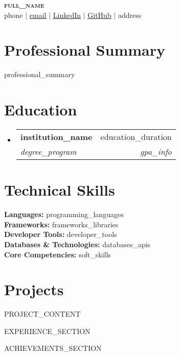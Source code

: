\documentclass[letterpaper,11pt]{article}
\makeatletter
\newcommand{\resumeSubheading}[4]{
  \vspace{-1pt}\item
    \begin{tabular*}{0.97\textwidth}[t]{l@{\extracolsep{\fill}}r}
      \textbf{#1} & #2 \\
      \textit{\small#3} & \textit{\small #4} \\
    \end{tabular*}\vspace{-5pt}
}
\newcommand{\resumeSubHeadingListStart}{\begin{itemize}[leftmargin=0.15in, label={}]}
\newcommand{\resumeSubHeadingListEnd}{\end{itemize}}
\makeatother
\begin{document}
\begin{center}
    \textbf{\Huge \scshape {{full_name}}} \\ \vspace{1pt}
    \small {{phone}} $|$ \href{mailto:{{email}}}{\underline{{{email}}}} $|$ 
    \href{{{linkedin_url}}}{\underline{LinkedIn}} $|$
    \href{{{github_url}}}{\underline{GitHub}} $|$
    {{address}}
\end{center}

\section{Professional Summary}
{{professional_summary}}

\section{Education}
  \resumeSubHeadingListStart
    \resumeSubheading
      {{{institution_name}}}{{{education_duration}}}
      {{{degree_program}}}{{{gpa_info}}}
  \resumeSubHeadingListEnd

\section{Technical Skills}
 \begin{itemize}[leftmargin=0.15in, label={}]
    \small{\item{
     \textbf{Languages:} {{programming_languages}} \\
     \textbf{Frameworks:} {{frameworks_libraries}} \\
     \textbf{Developer Tools:} {{developer_tools}} \\
     \textbf{Databases \& Technologies:} {{databases_apis}} \\
     \textbf{Core Competencies:} {{soft_skills}}
    }}
 \end{itemize}

\section{Projects}
    \resumeSubHeadingListStart
      {{PROJECT_CONTENT}}
    \resumeSubHeadingListEnd

{{EXPERIENCE_SECTION}}

{{ACHIEVEMENTS_SECTION}}
\end{document}
